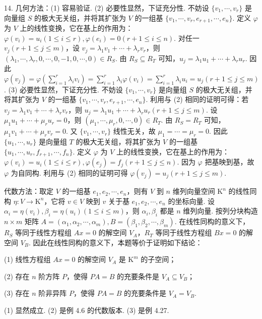 \documentclass[UTF8,12pt,a4paper,fontset=fandol]{ctexart}
\begin{document}
14. 几何方法：(1) 容易验证. (2) 必要性显然，下证充分性. 不妨设 $\{v_1,\cdots,v_r\}$ 是向量组 $S$ 的极大无关组，并将其扩张为 $V$ 的一组基 $\{v_1,\cdots,v_r,e_{r+1},\cdots,e_n\}$. 定义 $\varphi$ 为 $V$ 上的线性变换，它在基上的作用为：$\varphi(v_i)=u_i(1\le i\le r),\varphi(e_i)=0(r+1\le i\le n)$. 对任一 $v_j(r+1\le j\le m)$，设 $v_j=\lambda_1v_1+\cdots+\lambda_rv_r$，则 $(\lambda_1,\cdots,\lambda_r,0,\cdots,0,-1,0,\cdots,0)\in R_S$. 由 $R_S\subseteq R_T$ 可知，$u_j=\lambda_1u_1+\cdots+\lambda_ru_r$. 因此 $\varphi(v_j)=\varphi(\sum_{i=1}^r\lambda_iv_i)=\sum_{i=1}^r\lambda_i\varphi(v_i)=\sum_{i=1}^r\lambda_iu_i=u_j(r+1\le j\le m)$. (3) 必要性显然，下证充分性. 不妨设 $\{v_1,\cdots,v_r\}$ 是向量组 $S$ 的极大无关组，并将其扩张为 $V$ 的一组基 $\{v_1,\cdots,v_r,e_{r+1},\cdots,e_n\}$. 利用与 (2) 相同的证明可得：若 $v_j=\lambda_1v_1+\cdots+\lambda_rv_r$，则 $u_j=\lambda_1u_1+\cdots+\lambda_ru_r(r+1\le j\le m)$. 设 $\mu_1u_1+\cdots+\mu_ru_r=0$，则 $(\mu_1,\cdots,\mu_r,0,\cdots,0)\in R_T$. 由 $R_S=R_T$ 可知，$\mu_1v_1+\cdots+\mu_rv_r=0$. 又 $\{v_1,\cdots,v_r\}$ 线性无关，故 $\mu_1=\cdots=\mu_r=0$. 因此 $\{u_1,\cdots,u_r\}$ 是向量组 $T$ 的极大无关组，将其扩张为 $V$ 的一组基 $\{u_1,\cdots,u_r,f_{r+1},\cdots,f_n\}$. 定义 $\varphi$ 为 $V$ 上的线性变换，它在基上的作用为：$\varphi(v_i)=u_i(1\le i\le r),\varphi(e_j)=f_j(r+1\le j\le n)$. 因为 $\varphi$ 把基映到基，故 $\varphi$ 为自同构. 利用与 (2) 相同的证明可得 $\varphi(v_j)=u_j(r+1\le j\le m)$.

代数方法：取定 $V$ 的一组基 $e_1,e_2,\cdots,e_n$，则有 $V$ 到 $n$ 维列向量空间 $\mathrm{K}^n$ 的线性同构 $\eta:V\to\mathrm{K}^n$，它将 $v\in V$ 映到 $v$ 关于基 $e_1,e_2,\cdots,e_n$ 的坐标向量. 设 $\alpha_i=\eta(v_i),\beta_i=\eta(u_i)(1\le i\le m)$，则 $\alpha_i,\beta_i$ 都是 $n$ 维列向量. 按列分块构造 $n\times m$ 矩阵 $A=(\alpha_1,\alpha_2,\cdots,\alpha_m),B=(\beta_1,\beta_2,\cdots,\beta_m)$. 在线性同构的意义下，$R_S$ 等同于线性方程组 $Ax=0$ 的解空间 $V_A$，$R_T$ 等同于线性方程组 $Bx=0$ 的解空间 $V_B$. 因此在线性同构的意义下，本题等价于证明如下结论：

(1) 线性方程组 $Ax=0$ 的解空间 $V_A$ 是 $\mathrm{K}^m$ 的子空间；

(2) 存在 $n$ 阶方阵 $P$，使得 $PA=B$ 的充要条件是 $V_A\subseteq V_B$；

(3) 存在 $n$ 阶非异阵 $P$，使得 $PA=B$ 的充要条件是 $V_A=V_B$.

(1) 显然成立. (2) 是例 4.6 的代数版本. (3) 是例 4.27.
\end{document}
